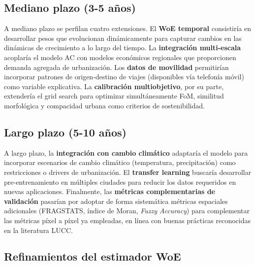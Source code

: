 \subsection{Mediano plazo (3-5 años)}

A mediano plazo se perfilan cuatro extensiones. El \textbf{WoE temporal} consistiría en desarrollar pesos que evolucionan dinámicamente para capturar cambios en las dinámicas de crecimiento a lo largo del tiempo. La \textbf{integración multi-escala} acoplaría el modelo AC con modelos económicos regionales que proporcionen demanda agregada de urbanización. Los \textbf{datos de movilidad} permitirían incorporar patrones de origen-destino de viajes (disponibles vía telefonía móvil) como variable explicativa. La \textbf{calibración multiobjetivo}, por su parte, extendería el grid search para optimizar simultáneamente FoM, similitud morfológica y compacidad urbana como criterios de sostenibilidad.

\subsection{Largo plazo (5-10 años)}

A largo plazo, la \textbf{integración con cambio climático} adaptaría el modelo para incorporar escenarios de cambio climático (temperatura, precipitación) como restricciones o drivers de urbanización. El \textbf{transfer learning} buscaría desarrollar pre-entrenamiento en múltiples ciudades para reducir los datos requeridos en nuevas aplicaciones. Finalmente, las \textbf{métricas complementarias de validación} pasarían por adoptar de forma sistemática métricas espaciales adicionales (FRAGSTATS, índice de Moran, \textit{Fuzzy Accuracy}) para complementar las métricas píxel a píxel ya empleadas, en línea con buenas prácticas reconocidas en la literatura LUCC.

\subsection{Refinamientos del estimador WoE}

